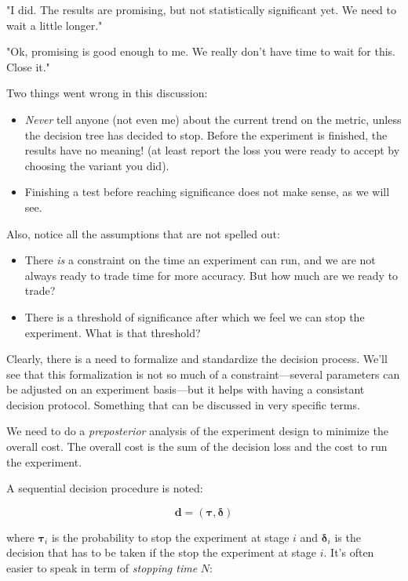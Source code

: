 \documentclass{tufte-book}
\begin{document}
"I did. The results are promising, but not statistically significant yet. We need to wait a little longer."

"Ok, promising is good enough to me. We really don't have time to wait for this. Close it."

Two things went wrong in this discussion:

\begin{itemize}
  \item \textit{Never} tell anyone (not even me) about the current trend on the metric, unless the decision
    tree has decided to stop. Before the experiment is finished, the results have no meaning! (at least report
    the loss you were ready to accept by choosing the variant you did).
  \item Finishing a test before reaching significance does not make sense, as we will see.
\end{itemize}

Also, notice all the assumptions that are not spelled out:

\begin{itemize}
  \item There \textit{is} a constraint on the time an experiment can run, and we are not always ready to trade
    time for more accuracy. But how much are we ready to trade?
  \item There is a threshold of significance after which we feel we can stop the experiment. What is that
      threshold?
\end{itemize}

Clearly, there is a need to formalize and standardize the decision process. We'll see that this formalization
is not so much of a constraint---several parameters can be adjusted on an experiment basis---but it helps with
having a consistant decision protocol. Something that can be discussed in very specific terms.


We need to do a \textit{preposterior} analysis of the experiment design to minimize the overall cost. The
overall cost is the sum of the decision loss and the cost to run the experiment.

A sequential decision procedure is noted:

\begin{equation}
  \mathbf{d} = \left(\mathbf{\tau}, \mathbf{\delta}\right)
\end{equation}

where $\mathbf{\tau}_i$ is the probability to stop the experiment at stage $i$ and $\mathbf{\delta}_i$ is the
decision that has to be taken if the stop the experiment at stage $i$. It's often easier to speak in term of
\textit{stopping time} $N$:
\end{document}
